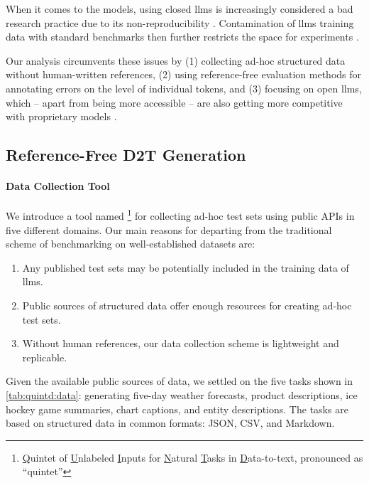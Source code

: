 When it comes to the models, using closed \acp{llm} \cite{openai2023gpt4,chatgpt} is increasingly considered a bad research practice due to its non-reproducibility \cite{rogers2023closed,chen2023chatgpt}. Contamination of \acp{llm} training data with standard benchmarks then further restricts the space for experiments \cite{golchin2023time,aiyappa-etal-2023-trust,balloccu2024leak}.

Our analysis circumvents these issues by (1) collecting ad-hoc structured data without human-written references, (2) using reference-free evaluation methods for annotating errors on the level of individual tokens, and (3) focusing on open \acp{llm}, which -- apart from being more accessible -- are also getting more competitive with proprietary models \cite{zheng2023judging,open-llm-leaderboard}.





\subsection{Reference-Free D2T Generation}
\label{sec:quintd:data}

\paragraph{Data Collection Tool}
\label{sec:quintd:data_collection}
We introduce a tool named \datatool\footnote{\underline{Q}uintet of \underline{U}nlabeled \underline{I}nputs for \underline{N}atural \underline{T}asks in \underline{D}ata-to-text, pronounced as ``quintet''} for collecting ad-hoc test sets using public APIs in five different domains.
Our main reasons for departing from the traditional scheme of benchmarking on well-established datasets are:
\begin{enumerate}
    \item Any published test sets may be potentially included in the training data of \acp{llm}.
    \item Public sources of structured data offer enough resources for creating ad-hoc test sets.
    \item Without human references, our data collection scheme is lightweight and replicable.
\end{enumerate}

Given the available public sources of data, we settled on the five tasks shown in \autoref{tab:quintd:data}: generating five-day weather forecasts, product descriptions, ice hockey game summaries, chart captions, and entity descriptions. The tasks are based on structured data in common formats: JSON, CSV, and Markdown.


